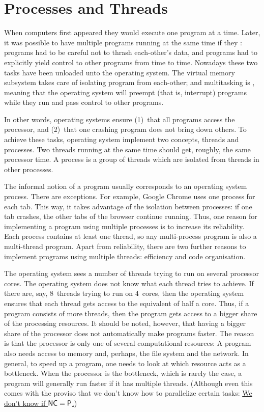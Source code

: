 \chapter{Processes and Threads}\label{ch:08-multiprocessing}

\noindent
When computers first appeared they would execute one program at a time.
Later,
  it was possible to have multiple programs running at the same time
  if they :
programs had to be careful not to thrash each-other's data,
and programs had to explicitly yield control to other programs from time to time.
Nowadays these two tasks have been unloaded unto the operating system.
The virtual memory subsystem takes care of isolating program from each-other;
and multitasking is ,
  meaning that the operating system will preempt (that is, interrupt)
  programs while they run and pass control to other programs.

In other words, operating systems ensure
  (1)~that all programs access the processor, and
  (2)~that one crashing program does not bring down others.
To achieve these tasks, operating system implement two concepts,
  threads and processes.
Two threads running at the same time should get, roughly, the same processor time.
A process is a group of threads which are isolated from threads in other processes.

The informal notion of a program usually corresponds to an operating system process.
There are exceptions.
For example, Google Chrome uses one process for each tab.
This way,
  it takes advantage of the isolation between processes:
  if one tab crashes, the other tabs of the browser continue running.
Thus, one reason for implementing a program using multiple processes
  is to increase its reliability.
Each process contains at least one thread,
  so any multi-process program is also a multi-thread program.
Apart from reliability, there are two further reasons to implement programs
  using multiple threads: efficiency and code organisation.

The operating system sees a number of threads trying to run on several processor cores.
The operating system does not know what each thread tries to achieve.
If there are, say, 8~threads trying to run on 4~cores,
  then the operating system ensures that each thread gets access
    to the equivalent of half a core.
Thus, if a program consists of more threads,
  then the program gets access to a bigger share of the processing resources.
It should be noted, however,
  that having a bigger share of the processor
    does not automatically make programs faster.
The reason is that the processor is only one of several computational resources:
A program also needs access to memory and, perhaps, the file system and the network.
In general, to speed up a program,
  one needs to look at which resource acts as a bottleneck.
When the processor is the bottleneck, which is rarely the case,
  a program will generally run faster if it has multiple threads.
(Although even this comes with the proviso that
  we don't know how to parallelize certain tasks:
\href{https://en.wikipedia.org/wiki/NC_(complexity)}%
  {We don't know if ${\sf NC}={\sf P}$.})

